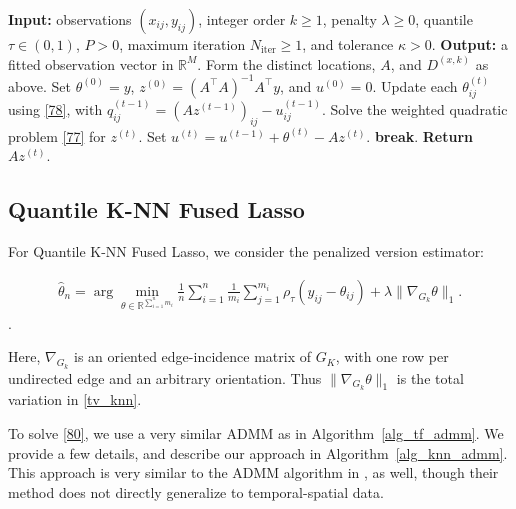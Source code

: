 \documentclass[twoside,11pt]{article}
\newcommand{\rev}[1]{{\color{revisionred}#1}}
\newenvironment{revision}{\color{revisionred}}{}
\begin{document}
\begin{algorithm}[!htbp]
\begin{revision}
   \caption{ADMM for discrete penalized quantile temporal-spatial trend filtering in \eqref{70}}
\label{alg_tf_admm}
\begin{algorithmic}[1]
    \STATE \textbf{Input:} observations \((x_{ij},y_{ij})\), integer order \(k\geq1\),
    penalty \(\lambda\geq0\), quantile \(\tau\in(0,1)\), \(P>0\),
    maximum iteration \(N_{\mathrm{iter}}\geq1\), and tolerance \(\kappa>0\).
    \STATE \textbf{Output:} a fitted observation vector in \(\mathbb R^M\).
    \STATE Form the distinct locations, \(A\), and \(D^{(x,k)}\) as above.
    Set \(\theta^{(0)}=y\), \(z^{(0)}=(A^\top A)^{-1}A^\top y\),
    and \(u^{(0)}=0\).
    \STATE Update each \(\theta_{ij}^{(t)}\) using \eqref{78}, with
    \(q_{ij}^{(t-1)}=(Az^{(t-1)})_{ij}-u_{ij}^{(t-1)}\).
    \STATE Solve the weighted quadratic problem \eqref{77} for \(z^{(t)}\).
    \STATE Set \(u^{(t)}=u^{(t-1)}+\theta^{(t)}-Az^{(t)}\).
        \STATE \textbf{break}.
    \ENDIF
\ENDFOR
\STATE \textbf{Return} \(Az^{(t)}\).
\end{algorithmic}
\end{revision}
\end{algorithm}

\subsection{Quantile K-NN Fused Lasso}

For Quantile K-NN Fused Lasso, we consider the penalized  version estimator:

\begin{align}
\label{80}
\hat{\theta}_n = \arg\min_{\theta \in \mathbb{R}^{\sum_{i=1}^n m_i}}\frac{1}{n} \sum_{i=1}^n \frac{1}{m_i} \sum_{j=1}^{m_i} \rho_{\tau}(y_{ij} - \theta_{ij}) + \lambda \|\nabla_{G_k} \theta\|_1. 
\end{align}. 

\rev{Here, $\nabla_{G_k}$ is an oriented edge-incidence matrix of
$G_K$, with one row per undirected edge and an arbitrary orientation.
Thus $\|\nabla_{G_k}\theta\|_1$ is the total variation in \eqref{tv_knn}.}

To solve \eqref{80}, we use a very similar ADMM as in Algorithm~\ref{alg_tf_admm}. We provide a few details, and describe our approach in Algorithm~\ref{alg_knn_admm}. This approach is very similar to the ADMM algorithm in \cite{ye2021non}, as well, though their method does not directly generalize to temporal-spatial data. 
\end{document}
